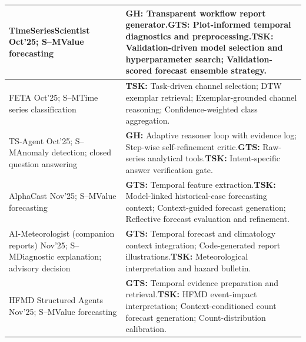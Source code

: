 \documentclass[preprints,article,submit,moreauthors]{Definitions/mdpi}
\newcommand{\typeSMshort}{\textsf{S--M}}
\begin{document}
\begin{longtable}{@{}>{\raggedright\arraybackslash}p{}p{}@{}}
TimeSeries\allowbreak Scientist \citep{timeseriesscientist2025} Oct'25; \typeSMshort{}\newline Value forecasting & \textbf{GH:} Transparent workflow report generator.\newline\textbf{GTS:} Plot-informed temporal diagnostics and preprocessing.\newline\textbf{TSK:} Validation-driven model selection and hyperparameter search; Validation-scored forecast ensemble strategy.\\\midrule
FETA \citep{feta2025} Oct'25; \typeSMshort{}\newline Time series classification & \textbf{TSK:} Task-driven channel selection; DTW exemplar retrieval; Exemplar-grounded channel reasoning; Confidence-weighted class aggregation.\\\midrule
TS-Agent \citep{tsagent2025} Oct'25; \typeSMshort{}\newline Anomaly detection; closed question answering & \textbf{GH:} Adaptive reasoner loop with evidence log; Step-wise self-refinement critic.\newline\textbf{GTS:} Raw-series analytical tools.\newline\textbf{TSK:} Intent-specific answer verification gate.\\\midrule
AlphaCast \citep{alphacast2025} Nov'25; \typeSMshort{}\newline Value forecasting & \textbf{GTS:} Temporal feature extraction.\newline\textbf{TSK:} Model-linked historical-case forecasting context; Context-guided forecast generation; Reflective forecast evaluation and refinement.\\\midrule
AI-Meteorologist (companion reports) \citep{aimeteorologist2025} Nov'25; \typeSMshort{}\newline Diagnostic explanation; advisory decision & \textbf{GTS:} Temporal forecast and climatology context integration; Code-generated report illustrations.\newline\textbf{TSK:} Meteorological interpretation and hazard bulletin.\\\midrule
HFMD Structured Agents \citep{epidemicagent2026} Nov'25; \typeSMshort{}\newline Value forecasting & \textbf{GTS:} Temporal evidence preparation and retrieval.\newline\textbf{TSK:} HFMD event-impact interpretation; Context-conditioned count forecast generation; Count-distribution calibration.\\\midrule

\end{longtable}
\end{document}
